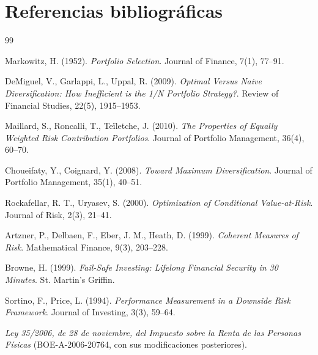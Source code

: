 \documentclass[11pt,a4paper]{article}
\begin{document}
\section{Referencias bibliográficas}

\begin{thebibliography}{99}

Markowitz, H. (1952). \textit{Portfolio Selection}. Journal of Finance, 7(1), 77--91.

DeMiguel, V., Garlappi, L., Uppal, R. (2009). \textit{Optimal Versus Naive Diversification: How Inefficient is the 1/N Portfolio Strategy?}. Review of Financial Studies, 22(5), 1915--1953.

Maillard, S., Roncalli, T., Teïletche, J. (2010). \textit{The Properties of Equally Weighted Risk Contribution Portfolios}. Journal of Portfolio Management, 36(4), 60--70.

Choueifaty, Y., Coignard, Y. (2008). \textit{Toward Maximum Diversification}. Journal of Portfolio Management, 35(1), 40--51.

Rockafellar, R. T., Uryasev, S. (2000). \textit{Optimization of Conditional Value-at-Risk}. Journal of Risk, 2(3), 21--41.

Artzner, P., Delbaen, F., Eber, J. M., Heath, D. (1999). \textit{Coherent Measures of Risk}. Mathematical Finance, 9(3), 203--228.

Browne, H. (1999). \textit{Fail-Safe Investing: Lifelong Financial Security in 30 Minutes}. St. Martin's Griffin.

Sortino, F., Price, L. (1994). \textit{Performance Measurement in a Downside Risk Framework}. Journal of Investing, 3(3), 59--64.

\textit{Ley 35/2006, de 28 de noviembre, del Impuesto sobre la Renta de las Personas Físicas} (BOE-A-2006-20764, con sus modificaciones posteriores).

\end{thebibliography}
\end{document}
